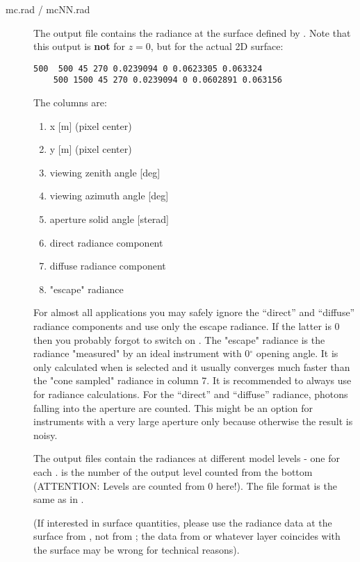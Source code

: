 \begin{description}
\item[mc.rad / mcNN.rad] 
  The output file  contains the radiance 
  at the surface defined by . Note that
  this output is {\bf not} for $z=0$, but for the actual 2D surface:
  \begin{Verbatim}[fontsize=\footnotesize, frame=single, samepage=true]
    500  500 45 270 0.0239094 0 0.0623305 0.063324
    500 1500 45 270 0.0239094 0 0.0602891 0.063156
  \end{Verbatim}
  The columns are:
  \begin{enumerate}
  \item  x [m] (pixel center)
  \item  y [m] (pixel center)
  \item  viewing zenith angle  [deg]
  \item  viewing azimuth angle [deg]
  \item  aperture solid angle [sterad]
  \item  direct  radiance component
  \item  diffuse radiance component
  \item "escape" radiance 
  \end{enumerate}
  For almost all applications you may safely ignore the ``direct'' and
  ``diffuse'' radiance components and use only the escape radiance. If the 
  latter is 0 then you probably forgot to switch on .
  The "escape" radiance is the radiance "measured" by an ideal
  instrument with 0$^\circ$ opening angle. It is only calculated 
  when  is selected and it usually converges 
  much faster than the "cone sampled" radiance in column 7. 
  It is recommended to always use  for radiance
  calculations. For the ``direct'' and ``diffuse'' radiance, photons
  falling into the aperture are counted. This might be an option for 
  instruments with a very large aperture only because otherwise the result
  is noisy. 

  The output files  contain the radiances
  at different model levels - one for each .  is the
  number of the output level counted from the bottom (ATTENTION: Levels are
  counted from 0 here!). The file format is the same as in .
  
  (If interested in surface quantities, please use the radiance data
  at the surface from , not from ; the data from 
   or whatever layer coincides with the 
  surface may be wrong for technical reasons).


\end{description}
